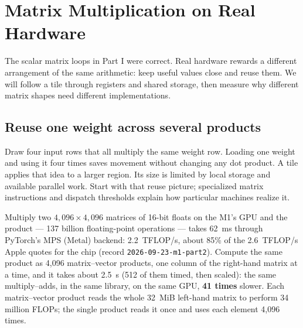 \chapter{Matrix Multiplication on Real Hardware}\label{ch:matmul-hardware}

\begin{ChapterIntent}
The scalar matrix loops in Part I were correct. Real hardware rewards a different
arrangement of the same arithmetic: keep useful values close and reuse them. We will
follow a tile through registers and shared storage, then measure why different matrix
shapes need different implementations.
\end{ChapterIntent}

\section*{Reuse one weight across several products}
Draw four input rows that all multiply the same weight row. Loading one weight and using
it four times saves movement without changing any dot product. A tile applies that idea
to a larger region. Its size is limited by local storage and available parallel work.
Start with that reuse picture; specialized matrix instructions and dispatch thresholds
explain how particular machines realize it.


Multiply two $4{,}096\times4{,}096$ matrices of 16-bit floats on the M1's GPU
and the product --- 137 billion floating-point operations --- takes 62~ms
through PyTorch's MPS (Metal) backend: 2.2~TFLOP/s, about 85\% of the 2.6~TFLOP/s
Apple quotes for the chip (record \texttt{2026-09-23-m1-part2}). Compute the
same product as 4,096 matrix--vector products, one column of the right-hand
matrix at a time, and it takes about 2.5~s (512 of them timed, then scaled):
the same multiply--adds, in the same library, on the same GPU,
\textbf{41 times} slower. Each matrix--vector product reads the whole 32~MiB
left-hand matrix to perform 34 million FLOPs; the single product reads it once
and uses each element 4,096 times.


